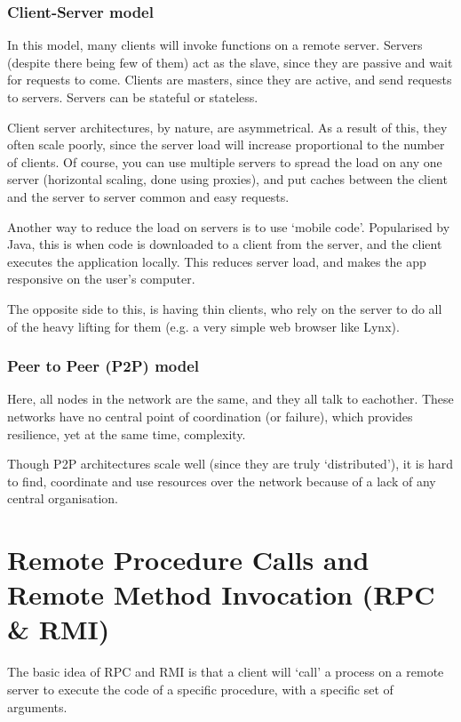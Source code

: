 \subsubsection{Client-Server model}

In this model, many clients will invoke functions on a remote server. Servers
(despite there being few of them) act as the slave, since they are passive and
wait for requests to come. Clients are masters, since they are active, and send
requests to servers. Servers can be stateful or stateless.

Client server architectures, by nature, are asymmetrical. As a result of this,
they often scale poorly, since the server load will increase proportional to the
number of clients. Of course, you can use multiple servers to spread the load on
any one server (horizontal scaling, done using proxies), and put caches between
the client and the server to server common and easy requests.

Another way to reduce the load on servers is to use `mobile code'. Popularised
by Java, this is when code is downloaded to a client from the server, and the
client executes the application locally. This reduces server load, and makes the
app responsive on the user's computer.

The opposite side to this, is having thin clients, who rely on the server to do
all of the heavy lifting for them (e.g. a very simple web browser like Lynx).

\subsubsection{Peer to Peer (P2P) model}

Here, all nodes in the network are the same, and they all talk to eachother.
These networks have no central point of coordination (or failure), which
provides resilience, yet at the same time, complexity.

Though P2P architectures scale well (since they are truly `distributed'), it is
hard to find, coordinate and use resources over the network because of a lack of
any central organisation.


\section{Remote Procedure Calls and Remote Method Invocation (RPC \& RMI)}

The basic idea of RPC and RMI is that a client will `call' a process on a remote
server to execute the code of a specific procedure, with a specific set of
arguments.

